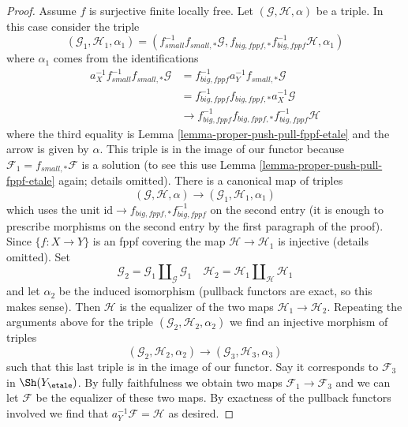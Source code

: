 \begin{proof}
\medskip\noindent
Assume $f$ is surjective finite locally free.
Let $(\mathcal{G}, \mathcal{H}, \alpha)$ be a triple.
In this case consider the triple
$$
(\mathcal{G}_1, \mathcal{H}_1, \alpha_1) =
(f_{small}^{-1}f_{small, *}\mathcal{G},
f_{big, fppf, *}f_{big, fppf}^{-1}\mathcal{H}, \alpha_1)
$$
where $\alpha_1$ comes from the identifications
\begin{align*}
a_X^{-1}f_{small}^{-1}f_{small, *}\mathcal{G}
& =
f_{big, fppf}^{-1}a_Y^{-1}f_{small, *}\mathcal{G} \\
& =
f_{big, fppf}^{-1}f_{big, fppf, *}a_X^{-1}\mathcal{G} \\
& \to
f_{big, fppf}^{-1}f_{big, fppf, *}f_{big, fppf}^{-1}\mathcal{H}
\end{align*}
where the third equality is Lemma \ref{lemma-proper-push-pull-fppf-etale}
and the arrow is given by $\alpha$.
This triple is in the image of our functor because
$\mathcal{F}_1 = f_{small, *}\mathcal{F}$ is a solution
(to see this use Lemma \ref{lemma-proper-push-pull-fppf-etale} again;
details omitted). There is a canonical map of triples
$$
(\mathcal{G}, \mathcal{H}, \alpha)
\to
(\mathcal{G}_1, \mathcal{H}_1, \alpha_1)
$$
which uses the unit $\text{id} \to f_{big, fppf, *}f_{big, fppf}^{-1}$
on the second entry (it is enough to prescribe morphisms on the
second entry by the first paragraph of the proof). Since
$\{f : X \to Y\}$ is an fppf covering the map
$\mathcal{H} \to \mathcal{H}_1$ is injective (details omitted).
Set
$$
\mathcal{G}_2 = \mathcal{G}_1 \amalg_\mathcal{G} \mathcal{G}_1\quad
\mathcal{H}_2 = \mathcal{H}_1 \amalg_\mathcal{H} \mathcal{H}_1
$$
and let $\alpha_2$ be the induced isomorphism (pullback functors
are exact, so this makes sense). Then $\mathcal{H}$ is the
equalizer of the two maps $\mathcal{H}_1 \to \mathcal{H}_2$.
Repeating the arguments above for the triple
$(\mathcal{G}_2, \mathcal{H}_2, \alpha_2)$
we find an injective morphism of triples
$$
(\mathcal{G}_2, \mathcal{H}_2, \alpha_2)
\to
(\mathcal{G}_3, \mathcal{H}_3, \alpha_3)
$$
such that this last triple is in the image of our functor.
Say it corresponds to $\mathcal{F}_3$ in $\Sh(Y_\etale)$.
By fully faithfulness we obtain two maps
$\mathcal{F}_1 \to \mathcal{F}_3$ and we can let
$\mathcal{F}$ be the equalizer of these two maps.
By exactness of the pullback functors involved we
find that $a_Y^{-1}\mathcal{F} = \mathcal{H}$ as desired.
\end{proof}

